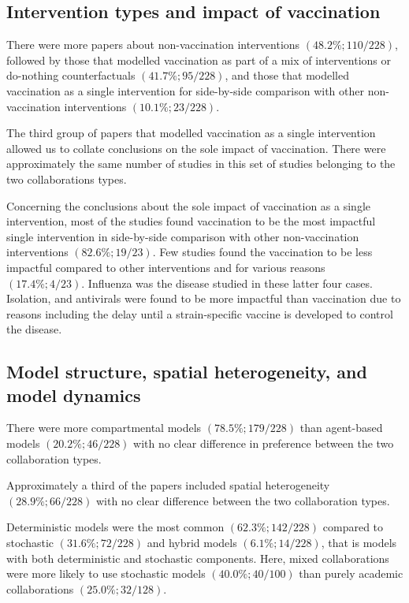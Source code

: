 \documentclass[10pt,letterpaper]{article}
\begin{document}
\subsection*{Intervention types and impact of vaccination}
There were more papers about non-vaccination interventions $(48.2\%; 110/228)$, followed by those that modelled vaccination as part of a mix of interventions or do-nothing counterfactuals $(41.7\%; 95/228)$, and those that modelled vaccination as a single intervention for side-by-side comparison with other non-vaccination interventions $(10.1\%; 23/228)$. 

The third group of papers that modelled vaccination as a single intervention allowed us to collate conclusions on the sole impact of vaccination. There were approximately the same number of studies in this set of studies belonging to the two collaborations types. 

Concerning the conclusions about the sole impact of vaccination as a single intervention, most of the studies found vaccination to be the most impactful single intervention in side-by-side comparison with other non-vaccination interventions $(82.6\%; 19/23)$. Few studies found the vaccination to be less impactful compared to other interventions and for various reasons $(17.4\%; 4/23)$. Influenza was the disease studied in these latter four cases. Isolation, and antivirals were found to be more impactful than vaccination due to reasons including the delay until a strain-specific vaccine is developed to control the disease. 

\subsection*{Model structure, spatial heterogeneity, and model dynamics}
There were more compartmental models $(78.5\%; 179/228)$ than agent-based models $(20.2\%; 46/228)$ with no clear difference in preference between the two collaboration types. 

Approximately a third of the papers included spatial heterogeneity $(28.9\%; 66/228)$ with no clear difference between the two collaboration types. 

Deterministic models were the most common $(62.3\%; 142/228)$ compared to stochastic $(31.6\%; 72/228)$ and hybrid models $(6.1\%; 14/228)$, that is models with both deterministic and stochastic components. Here, mixed collaborations were more likely to use stochastic models $(40.0\%; 40/100)$ than purely academic collaborations $(25.0\%; 32/128)$. 
\end{document}
